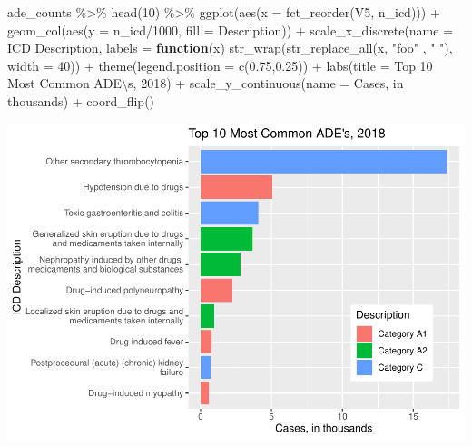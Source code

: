 \documentclass[preprint, 3p,
authoryear]{elsarticle} %
\newenvironment{Shaded}{\begin{snugshade}}{\end{snugshade}}
\newcommand{\AttributeTok}[1]{\textcolor[rgb]{0.77,0.63,0.00}{#1}}
\newcommand{\ControlFlowTok}[1]{\textcolor[rgb]{0.13,0.29,0.53}{\textbf{#1}}}
\newcommand{\DecValTok}[1]{\textcolor[rgb]{0.00,0.00,0.81}{#1}}
\newcommand{\FloatTok}[1]{\textcolor[rgb]{0.00,0.00,0.81}{#1}}
\newcommand{\FunctionTok}[1]{\textcolor[rgb]{0.00,0.00,0.00}{#1}}
\newcommand{\NormalTok}[1]{#1}
\newcommand{\SpecialCharTok}[1]{\textcolor[rgb]{0.00,0.00,0.00}{#1}}
\newcommand{\StringTok}[1]{\textcolor[rgb]{0.31,0.60,0.02}{#1}}
\begin{document}
\begin{Shaded}
\begin{Highlighting}[]
\NormalTok{ade\_counts }\SpecialCharTok{\%\textgreater{}\%}
  \FunctionTok{head}\NormalTok{(}\DecValTok{10}\NormalTok{) }\SpecialCharTok{\%\textgreater{}\%}
  \FunctionTok{ggplot}\NormalTok{(}\FunctionTok{aes}\NormalTok{(}\AttributeTok{x =} \FunctionTok{fct\_reorder}\NormalTok{(V5, n\_icd))) }\SpecialCharTok{+}
  \FunctionTok{geom\_col}\NormalTok{(}\FunctionTok{aes}\NormalTok{(}\AttributeTok{y =}\NormalTok{ n\_icd}\SpecialCharTok{/}\DecValTok{1000}\NormalTok{, }\AttributeTok{fill =}\NormalTok{ Description)) }\SpecialCharTok{+} 
  \FunctionTok{scale\_x\_discrete}\NormalTok{(}\AttributeTok{name =} \StringTok{\textquotesingle{}ICD Description\textquotesingle{}}\NormalTok{, }\AttributeTok{labels =} \ControlFlowTok{function}\NormalTok{(x) }\FunctionTok{str\_wrap}\NormalTok{(}\FunctionTok{str\_replace\_all}\NormalTok{(x, }\StringTok{"foo"}\NormalTok{ , }\StringTok{" "}\NormalTok{),}
                                                 \AttributeTok{width =} \DecValTok{40}\NormalTok{)) }\SpecialCharTok{+}
  \FunctionTok{theme}\NormalTok{(}\AttributeTok{legend.position =} \FunctionTok{c}\NormalTok{(}\FloatTok{0.75}\NormalTok{,}\FloatTok{0.25}\NormalTok{)) }\SpecialCharTok{+}
  \FunctionTok{labs}\NormalTok{(}\AttributeTok{title =} \StringTok{\textquotesingle{}Top 10 Most Common ADE}\SpecialCharTok{\textbackslash{}\textquotesingle{}}\StringTok{s, 2018\textquotesingle{}}\NormalTok{) }\SpecialCharTok{+}
  \FunctionTok{scale\_y\_continuous}\NormalTok{(}\AttributeTok{name =} \StringTok{\textquotesingle{}Cases, in thousands\textquotesingle{}}\NormalTok{) }\SpecialCharTok{+}
  \FunctionTok{coord\_flip}\NormalTok{() }
\end{Highlighting}
\end{Shaded}

\includegraphics{final-project-paper_files/figure-latex/top-10-ade-1.pdf}
\end{document}
